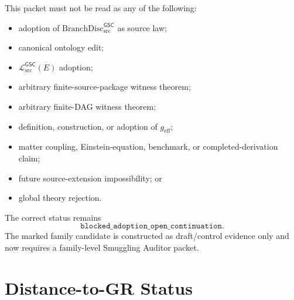 \documentclass[11pt]{article}
\newcommand{\MetricData}{\mathcal{L}_{\mathrm{src}}^{\mathsf{GSC}}}
\newcommand{\geff}{g_{\mathrm{eff}}}
\newcommand{\BranchDisc}{\mathrm{BranchDisc}_{\mathrm{src}}^{\mathsf{GSC}}}
\begin{document}
This packet must not be read as any of the following:
\begin{itemize}[leftmargin=*]
  \item adoption of \(\BranchDisc\) as source law;
  \item canonical ontology edit;
  \item \(\MetricData(E)\) adoption;
  \item arbitrary finite-source-package witness theorem;
  \item arbitrary finite-DAG witness theorem;
  \item definition, construction, or adoption of \(\geff\);
  \item matter coupling, Einstein-equation, benchmark, or completed-derivation
  claim;
  \item future source-extension impossibility; or
  \item global theory rejection.
\end{itemize}

The correct status remains
\[
\texttt{blocked\_adoption\_open\_continuation}.
\]
The marked family candidate is constructed as draft/control evidence only and
now requires a family-level Smuggling Auditor packet.

\section{Distance-to-GR Status}
\end{document}
